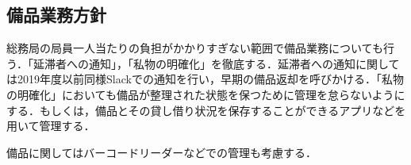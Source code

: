 \subsection*{備品業務方針}


総務局の局員一人当たりの負担がかかりすぎない範囲で備品業務についても行う．「延滞者への通知」，「私物の明確化」を徹底する．延滞者への通知に関しては2019年度以前同様Slackでの通知を行い，早期の備品返却を呼びかける．「私物の明確化」においても備品が整理された状態を保つために管理を怠らないようにする．もしくは，備品とその貸し借り状況を保存することができるアプリなどを用いて管理する．

備品に関してはバーコードリーダーなどでの管理も考慮する．
